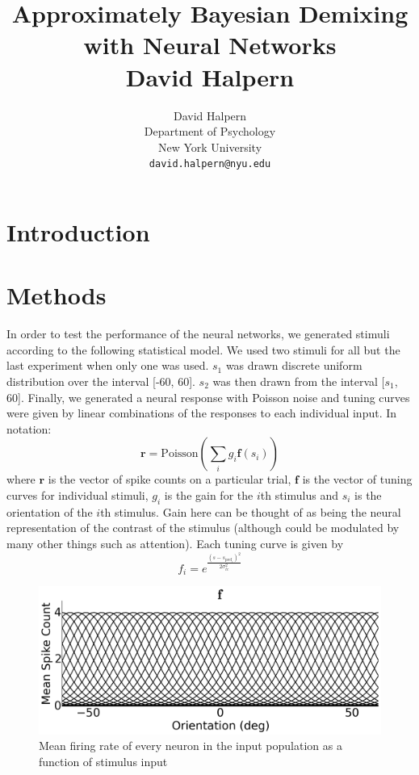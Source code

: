 \documentclass{article} %
\title{Approximately Bayesian Demixing with Neural Networks \\ David Halpern}
\author{
David Halpern\\
Department of Psychology\\
New York University\\
\texttt{david.halpern@nyu.edu} \\
}
\begin{document}
\maketitle


\section{Introduction}

\section{Methods}
In order to test the performance of the neural networks, we generated stimuli according to the following statistical model. We used two stimuli for all but the last experiment when only one was used. $s_1$ was drawn discrete uniform distribution over the interval [-60, 60]. $s_2$ was then drawn from the interval [$s_1$, 60]. Finally, we generated a neural response with Poisson noise and tuning curves were given by linear combinations of the responses to each individual input. In notation:
\begin{equation}
	\mathbf{r} = \text{Poisson}(\sum_i g_i \mathbf{f}(s_i))
\end{equation}
where $\mathbf{r}$ is the vector of spike counts on a particular trial, $\mathbf{f}$ is the vector of tuning curves for individual stimuli, $g_i$ is the gain for the $i$th stimulus and $s_i$ is the orientation of the $i$th stimulus. Gain here can be thought of as being the neural representation of the contrast of the stimulus (although could be modulated by many other things such as attention).
Each tuning curve is given by
\begin{equation}
	f_i = e^\frac{(s - s_{\text{pref}_i})^2}{2 \sigma_{tc}^2}
\end{equation}
\begin{figure}[h]
\centering
\includegraphics[width = \textwidth]{Tuning_Curves.png}
\caption{Mean firing rate of every neuron in the input population as a function of stimulus input}
\end{figure}
\end{document}
